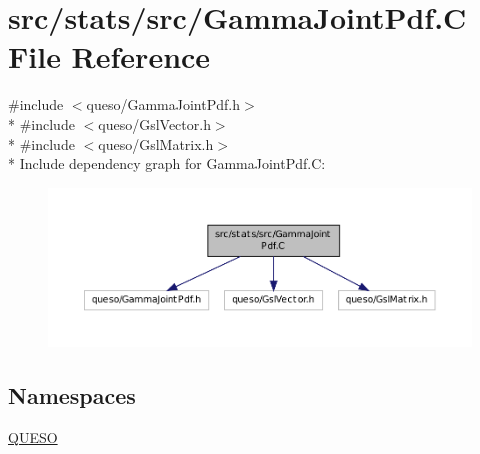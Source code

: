 \hypertarget{_gamma_joint_pdf_8_c}{\section{src/stats/src/\-Gamma\-Joint\-Pdf.C File Reference}
\label{_gamma_joint_pdf_8_c}
}
{\ttfamily \#include $<$queso/\-Gamma\-Joint\-Pdf.\-h$>$}\\*
{\ttfamily \#include $<$queso/\-Gsl\-Vector.\-h$>$}\\*
{\ttfamily \#include $<$queso/\-Gsl\-Matrix.\-h$>$}\\*
Include dependency graph for Gamma\-Joint\-Pdf.\-C\-:
\nopagebreak
\begin{figure}[H]
\begin{center}
\leavevmode
\includegraphics[width=350pt]{_gamma_joint_pdf_8_c__incl}
\end{center}
\end{figure}
\subsection*{Namespaces}
\begin{DoxyCompactItemize}
\item 
\hyperlink{namespace_q_u_e_s_o}{Q\-U\-E\-S\-O}
\end{DoxyCompactItemize}
